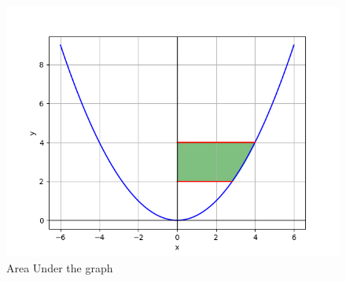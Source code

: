 \documentclass[journal]{IEEEtran}
\begin{document}
\begin{figure}[h]
    \centering
    \includegraphics[width=\columnwidth]{figs/fig1.png}
    \caption{Area Under the graph}
\end{figure}
\end{document}
